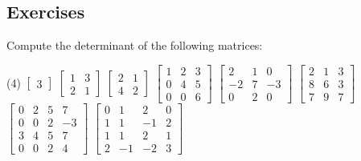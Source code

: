 \subsection{Exercises}

\begin{exercise}
Compute the determinant of the following matrices:
\begin{tasks}(4)
\task
$\begin{bmatrix}
3
\end{bmatrix}$
\task
$\begin{bmatrix}
1 & 3 \\
2 & 1
\end{bmatrix}$
\task
$\begin{bmatrix}
2 & 1 \\
4 & 2
\end{bmatrix}$
\task
$\begin{bmatrix}
1 & 2 & 3 \\
0 & 4 & 5 \\
0 & 0 & 6
\end{bmatrix}$
\task
$\begin{bmatrix}
2 & 1 & 0 \\
-2 & 7 & -3 \\
0 & 2 & 0
\end{bmatrix}$
\task
$\begin{bmatrix}
2 & 1 & 3 \\
8 & 6 & 3 \\
7 & 9 & 7
\end{bmatrix}$
\task
$\begin{bmatrix}
0 & 2 & 5 & 7 \\
0 & 0 & 2 & -3 \\
3 & 4 & 5 & 7 \\
0 & 0 & 2 & 4
\end{bmatrix}$
\task
$\begin{bmatrix}
0 &  1 &  2 &  0 \\
1 &  1 & -1 & 2 \\
1 &  1 &  2 & 1 \\
2 & -1 & -2 & 3
\end{bmatrix}$
\end{tasks}
\end{exercise}

